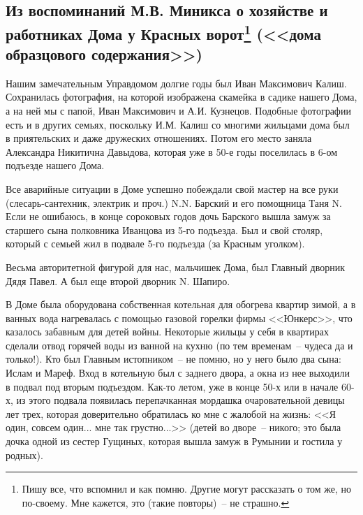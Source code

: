 \chapter{}

\section*{Из воспоминаний М.В. Миникса о хозяйстве и работниках Дома у Красных ворот\protect\footnote{Пишу все, что вспомнил и как помню. Другие могут рассказать о том же, но по-своему. Мне кажется, это (такие повторы)~-- не страшно.} (<<дома образцового содержания>>)}

Нашим замечательным Управдомом долгие годы был Иван Максимович Калиш. Сохранилась фотография, на которой изображена скамейка в садике нашего Дома, а на ней мы с папой, Иван Максимович и А.И. Кузнецов. Подобные фотографии есть и в других семьях, поскольку И.М. Калиш со многими жильцами дома был в приятельских и даже дружеских отношениях. Потом его место заняла Александра Никитична Давыдова, которая уже в 50-е годы поселилась в 6-ом подъезде нашего Дома.

Все аварийные ситуации в Доме успешно побеждали свой мастер на все руки (слесарь-сантехник, электрик и проч.) N.N. Барский и его помощница Таня N. Если не ошибаюсь, в конце сороковых годов дочь Барского вышла замуж за старшего сына полковника Иванцова из 5-го подъезда. Был и свой столяр, который с семьей жил в подвале 5-го подъезда (за Красным уголком).

Весьма авторитетной фигурой для нас, мальчишек Дома, был Главный дворник Дядя Павел. А был еще второй дворник N. Шапиро.

В Доме была оборудована собственная котельная для обогрева квартир зимой, а в ванных вода нагревалась с помощью газовой горелки фирмы <<Юнкерс>>, что казалось забавным для детей войны. Некоторые жильцы у себя в квартирах сделали отвод горячей воды из ванной на кухню (по тем временам~-- чудеса да и только!). Кто был Главным истопником~-- не помню, но у него было два сына: Ислам и  Мареф. Вход в котельную был с заднего двора, а окна из нее выходили в подвал под вторым подъездом. Как-то летом, уже в конце 50-х или в начале 60-х, из этого подвала появилась перепачканная мордашка очаровательной девицы лет трех, которая доверительно обратилась ко мне с жалобой на жизнь: <<Я один, совсем один... мне так грустно...>> (детей во дворе~-- никого; это была дочка одной из сестер Гущиных, которая вышла замуж в Румынии и гостила у родных).

